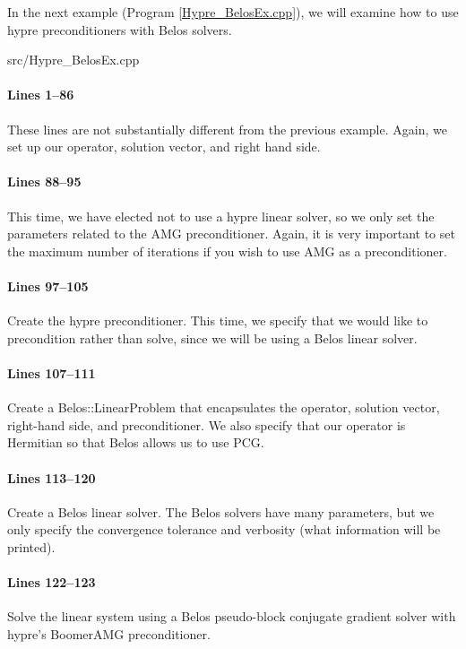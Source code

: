 In the next example (Program \ref{Hypre_BelosEx.cpp}), we will examine how to
use hypre preconditioners with Belos solvers.

\begin{lstinputlisting}[caption=Hypre\_BelosEx.cpp,label=Hypre_BelosEx.cpp]{src/Hypre_BelosEx.cpp}
\end{lstinputlisting}

\paragraph{Lines 1--86}
These lines are not substantially different from the previous example.  Again,
we set up our operator, solution vector, and right hand side.

\paragraph{Lines 88--95}
This time, we have elected not to use a hypre linear solver, so we only set the
parameters related to the AMG preconditioner.  Again, it is very important to
set the maximum number of iterations if you wish to use AMG as a preconditioner.

\paragraph{Lines 97--105}
Create the hypre preconditioner.  This time, we specify that we would like to
precondition rather than solve, since we will be using a Belos linear solver.

\paragraph{Lines 107--111}
Create a Belos::LinearProblem that encapsulates the operator, solution vector,
right-hand side, and preconditioner.  We also specify that our operator is
Hermitian so that Belos allows us to use PCG.

\paragraph{Lines 113--120}
Create a Belos linear solver.  The Belos solvers have many parameters, but we
only specify the convergence tolerance and verbosity (what information will be
printed).

\paragraph{Lines 122--123}
Solve the linear system using a Belos pseudo-block conjugate gradient solver
with hypre's BoomerAMG preconditioner.